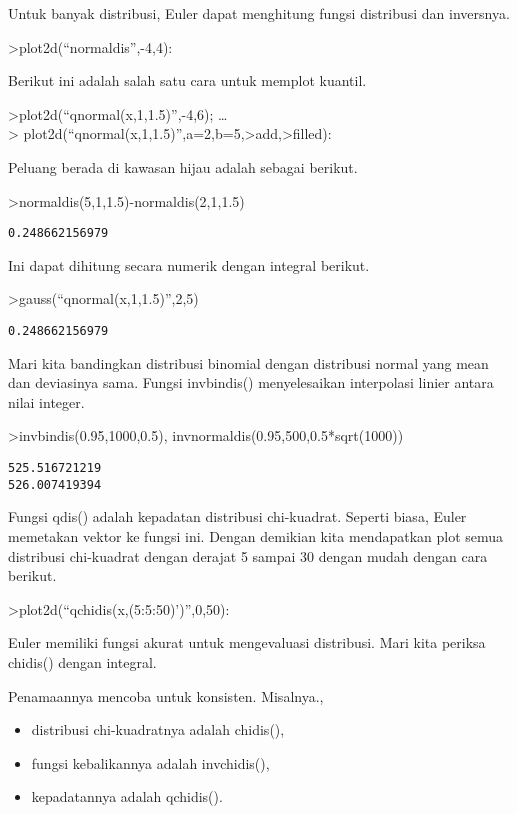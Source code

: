 \documentclass[
]{book}
\begin{document}
Untuk banyak distribusi, Euler dapat menghitung fungsi distribusi dan inversnya.

\textgreater plot2d(``normaldis'',-4,4):

Berikut ini adalah salah satu cara untuk memplot kuantil.

\textgreater plot2d(``qnormal(x,1,1.5)'',-4,6); \ldots{}\\
\textgreater{} plot2d(``qnormal(x,1,1.5)'',a=2,b=5,\textgreater add,\textgreater filled):

Peluang berada di kawasan hijau adalah sebagai berikut.

\textgreater normaldis(5,1,1.5)-normaldis(2,1,1.5)

\begin{verbatim}
0.248662156979
\end{verbatim}

Ini dapat dihitung secara numerik dengan integral berikut.

\textgreater gauss(``qnormal(x,1,1.5)'',2,5)

\begin{verbatim}
0.248662156979
\end{verbatim}

Mari kita bandingkan distribusi binomial dengan distribusi normal yang mean dan deviasinya sama. Fungsi invbindis() menyelesaikan interpolasi linier antara nilai integer.

\textgreater invbindis(0.95,1000,0.5), invnormaldis(0.95,500,0.5*sqrt(1000))

\begin{verbatim}
525.516721219
526.007419394
\end{verbatim}

Fungsi qdis() adalah kepadatan distribusi chi-kuadrat. Seperti biasa, Euler memetakan vektor ke fungsi ini. Dengan demikian kita mendapatkan plot semua distribusi chi-kuadrat dengan derajat 5 sampai 30 dengan mudah dengan cara berikut.

\textgreater plot2d(``qchidis(x,(5:5:50)')'',0,50):

Euler memiliki fungsi akurat untuk mengevaluasi distribusi. Mari kita periksa chidis() dengan integral.

Penamaannya mencoba untuk konsisten. Misalnya.,

\begin{itemize}
\item
  distribusi chi-kuadratnya adalah chidis(),
\item
  fungsi kebalikannya adalah invchidis(),
\item
  kepadatannya adalah qchidis().
\end{itemize}
\end{document}
